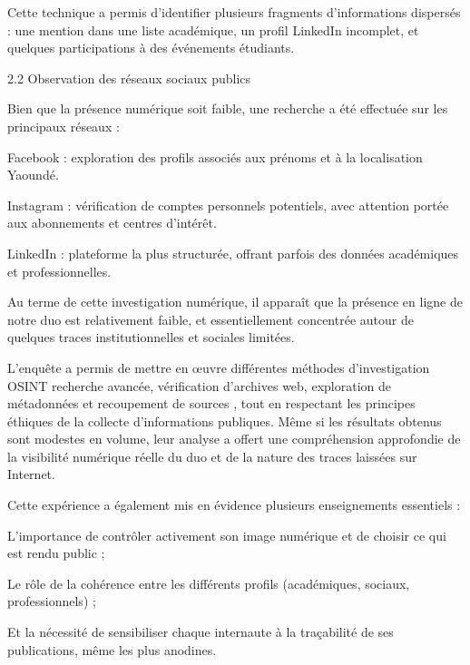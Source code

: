 \documentclass[12pt,a4paper]{report}
\begin{document}
Cette technique a permis d’identifier plusieurs fragments d’informations dispersés : une mention dans une liste académique, un profil LinkedIn incomplet, et quelques participations à des événements étudiants.

2.2 Observation des réseaux sociaux publics

Bien que la présence numérique soit faible, une recherche a été effectuée sur les principaux réseaux :

Facebook : exploration des profils associés aux prénoms et à la localisation Yaoundé.

Instagram : vérification de comptes personnels potentiels, avec attention portée aux abonnements et centres d’intérêt.

LinkedIn : plateforme la plus structurée, offrant parfois des données académiques et professionnelles.

Au terme de cette investigation numérique, il apparaît que la présence en ligne de notre duo est relativement faible, et essentiellement concentrée autour de quelques traces institutionnelles et sociales limitées.

L’enquête a permis de mettre en œuvre différentes méthodes d’investigation OSINT  recherche avancée, vérification d’archives web, exploration de métadonnées et recoupement de sources , tout en respectant les principes éthiques de la collecte d’informations publiques.
Même si les résultats obtenus sont modestes en volume, leur analyse a offert une compréhension approfondie de la visibilité numérique réelle du duo et de la nature des traces laissées sur Internet.

Cette expérience a également mis en évidence plusieurs enseignements essentiels :

L’importance de contrôler activement son image numérique et de choisir ce qui est rendu public ;

Le rôle de la cohérence entre les différents profils (académiques, sociaux, professionnels) ;

Et la nécessité de sensibiliser chaque internaute à la traçabilité de ses publications, même les plus anodines.
	
\end{document}
